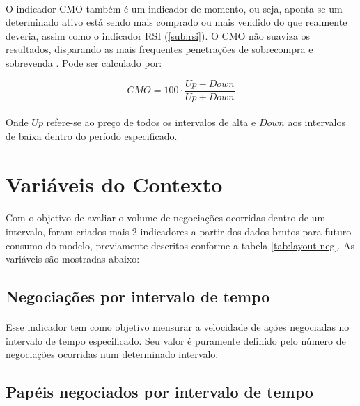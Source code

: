 \documentclass[grad,numbers]{coppe}
\begin{document}
            \paragraph{}O indicador CMO também é um indicador de momento, ou seja, aponta se um determinado ativo está sendo mais comprado ou mais vendido do que realmente deveria, assim como o indicador RSI (\ref{sub:rsi}). O CMO não suaviza os resultados, disparando as mais frequentes penetrações de sobrecompra e sobrevenda \cite{cmo-indicator}. Pode ser calculado por:
            
            \begin{equation}
                CMO = 100 \cdot \frac{Up - Down}{Up + Down}
            \end{equation}
            
            \paragraph{}Onde $Up$ refere-se ao preço de todos os intervalos de alta e $Down$ aos intervalos de baixa dentro do período especificado.
            
      \section{Variáveis do Contexto}
        \paragraph{}Com o objetivo de avaliar o volume de negociações ocorridas dentro de um intervalo, foram criados mais 2 indicadores a partir dos dados brutos para futuro consumo do modelo, previamente descritos conforme a tabela \ref{tab:layout-neg}. As variáveis são mostradas abaixo:
        
        \subsection{Negociações por intervalo de tempo}
            \paragraph{}Esse indicador tem como objetivo mensurar a velocidade de ações negociadas no intervalo de tempo especificado. Seu valor é puramente definido pelo número de negociações ocorridas num determinado intervalo.
            
        \subsection{Papéis negociados por intervalo de tempo}
\end{document}
